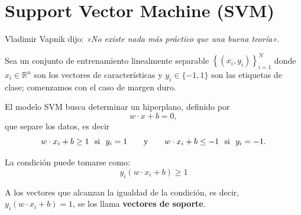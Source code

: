 \documentclass[a4,11pt]{aleph-notas}
\begin{document}
\encabezado


\section*{Support Vector Machine (SVM)}

Vladimir Vapnik dijo: \textit{«No existe nada más práctico que una buena teoría»}.

\begin{defi}
Sea un conjunto de entrenamiento linealmente separable $\left\{({x}_i, y_i)\right\}_{i=1}^N$ donde ${x}_i \in \mathbb{R}^n$ son los vectores de características y $y_i \in \{-1, 1\}$ son las etiquetas de clase; comenzamos con el caso de margen duro.

El modelo SVM busca determinar un hiperplano, definido por $${w} \cdot {x} + b = 0,$$ que separe los datos, es decir
\[
    {w} \cdot {x}_i + b \geq 1\ \text{ si }\ y_i = 1
    \qquad\text{y}\qquad
    {w} \cdot {x}_i + b \leq -1\ \text{ si }\ y_i = -1.
\]
\end{defi}

\begin{advertencia}
La condición puede tomarse como:
    $$y_i ({w} \cdot {x}_i + b) \geq 1$$
\end{advertencia}

\begin{advertencia}
A los vectores que alcanzan la igualdad de la condición, es decir, $y_i ({w} \cdot {x}_i + b) = 1$, se los llama \textbf{vectores de soporte}.
\end{advertencia}
\end{document}

